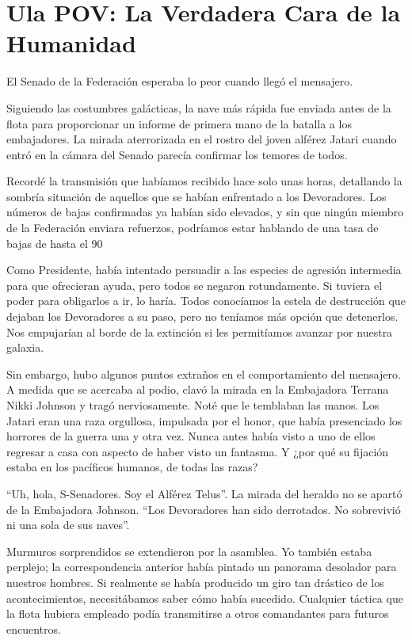 \documentclass[spanish,12pt,a4paper,oneside,titlepage]{book}
\begin{document}
    \chapter{Ula POV: La Verdadera Cara de la Humanidad}

    El Senado de la Federación esperaba lo peor cuando llegó el mensajero.

    Siguiendo las costumbres galácticas, la nave más rápida fue enviada antes de la flota para proporcionar un informe de primera mano de la batalla a los embajadores. La mirada aterrorizada en el rostro del joven alférez Jatari cuando entró en la cámara del Senado parecía confirmar los temores de todos.

    Recordé la transmisión que habíamos recibido hace solo unas horas, detallando la sombría situación de aquellos que se habían enfrentado a los Devoradores. Los números de bajas confirmadas ya habían sido elevados, y sin que ningún miembro de la Federación enviara refuerzos, podríamos estar hablando de una tasa de bajas de hasta el 90%

    Como Presidente, había intentado persuadir a las especies de agresión intermedia para que ofrecieran ayuda, pero todos se negaron rotundamente. Si tuviera el poder para obligarlos a ir, lo haría. Todos conocíamos la estela de destrucción que dejaban los Devoradores a su paso, pero no teníamos más opción que detenerlos. Nos empujarían al borde de la extinción si les permitíamos avanzar por nuestra galaxia.

    Sin embargo, hubo algunos puntos extraños en el comportamiento del mensajero. A medida que se acercaba al podio, clavó la mirada en la Embajadora Terrana Nikki Johnson y tragó nerviosamente. Noté que le temblaban las manos. Los Jatari eran una raza orgullosa, impulsada por el honor, que había presenciado los horrores de la guerra una y otra vez. Nunca antes había visto a uno de ellos regresar a casa con aspecto de haber visto un fantasma. Y ¿por qué su fijación estaba en los pacíficos humanos, de todas las razas?

    ``Uh, hola, S-Senadores. Soy el Alférez Telus''. La mirada del heraldo no se apartó de la Embajadora Johnson. ``Los Devoradores han sido derrotados. No sobrevivió ni una sola de sus naves''.

    Murmuros sorprendidos se extendieron por la asamblea. Yo también estaba perplejo; la correspondencia anterior había pintado un panorama desolador para nuestros hombres. Si realmente se había producido un giro tan drástico de los acontecimientos, necesitábamos saber cómo había sucedido. Cualquier táctica que la flota hubiera empleado podía transmitirse a otros comandantes para futuros encuentros.
\end{document}
